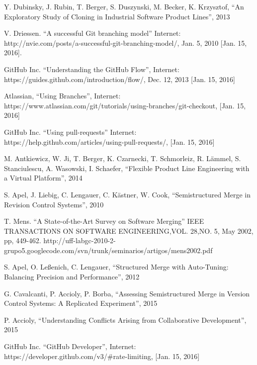 \begin{thebibliography}{69}
 Y. Dubinsky, J. Rubin, T. Berger, S. Duszynski, M. Becker, K. Krzysztof, “An Exploratory Study of Cloning in Industrial Software Product Lines”, 2013

 V. Driessen. “A successful Git branching model” Internet: http://nvie.com/posts/a-successful-git-branching-model/, Jan. 5, 2010 [Jan. 15, 2016].

 GitHub Inc. “Understanding the GitHub Flow”, Internet: https://guides.github.com/introduction/flow/, Dec. 12, 2013 [Jan. 15, 2016]

 Atlassian, “Using Branches”, Internet: https://www.atlassian.com/git/tutorials/using-branches/git-checkout, [Jan. 15, 2016]

 GitHub Inc. “Using pull-requests” Internet: https://help.github.com/articles/using-pull-requests/, [Jan. 15, 2016]

 M. Antkiewicz, W. Ji, T. Berger, K. Czarnecki, T. Schmorleiz, R. Lämmel, S. Stanciulescu, A. Wasowski, I. Schaefer, “Flexible Product Line Engineering with a Virtual Platform”, 2014

 S. Apel, J. Liebig, C. Lengauer, C. Kästner, W. Cook, “Semistructured Merge in Revision Control Systems”, 2010

 T. Mens. “A State-of-the-Art Survey on Software Merging” IEEE TRANSACTIONS ON SOFTWARE ENGINEERING,VOL. 28,NO. 5, May 2002, pp, 449-462.
http://uff-labgc-2010-2-grupo5.googlecode.com/svn/trunk/seminarios/artigos/mens2002.pdf

 S. Apel, O. Leßenich, C. Lengauer, “Structured Merge with Auto-Tuning: Balancing Precision and Performance”, 2012

 G. Cavalcanti, P. Accioly, P. Borba, “Assessing Semistructured Merge in Version Control Systems: A Replicated Experiment”, 2015

 P. Accioly, “Understanding Conflicts Arising from Collaborative Development”, 2015

 GitHub Inc. “GitHub Developer”, Internet: https://developer.github.com/v3/\#rate-limiting, [Jan. 15, 2016]
\end{thebibliography}
